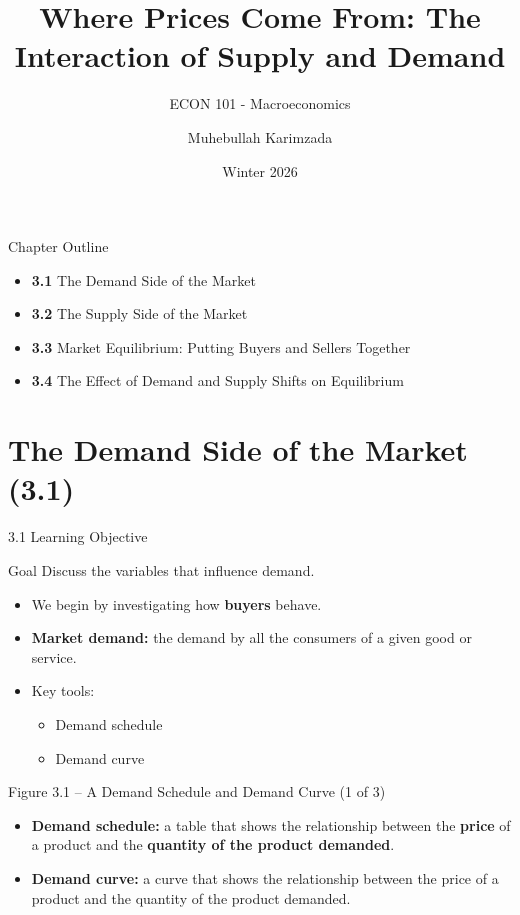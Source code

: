 \documentclass[aspectratio=169]{beamer}
\title{\textbf{Where Prices Come From: The Interaction of Supply and Demand \vspace{.5cm}\\  }}
\subtitle{ {\large ECON 101 - Macroeconomics}}
\author{Muhebullah Karimzada}
\date{Winter 2026}
\begin{document}
\begin{frame}[plain]
  \titlepage
\end{frame}

\begin{frame}{Chapter Outline}
\transfade
\begin{itemize}[<+->]
  \item \textbf{3.1} The Demand Side of the Market
  \item \textbf{3.2} The Supply Side of the Market
  \item \textbf{3.3} Market Equilibrium: Putting Buyers and Sellers Together
  \item \textbf{3.4} The Effect of Demand and Supply Shifts on Equilibrium
\end{itemize}
\end{frame}

\section{The Demand Side of the Market (3.1)}

\begin{frame}{3.1 Learning Objective}
\transfade
\begin{block}{Goal}
Discuss the variables that influence demand.
\end{block}
\begin{itemize}[<+->]
  \item We begin by investigating how \textbf{buyers} behave.
  \item \textbf{Market demand:} the demand by all the consumers of a given good or service.
  \item Key tools:
  \begin{itemize}[<+->]
    \item Demand schedule
    \item Demand curve
  \end{itemize}
\end{itemize}
\end{frame}

\begin{frame}{Figure 3.1 -- A Demand Schedule and Demand Curve (1 of 3)}
\transfade
\begin{itemize}[<+->]
  \item \textbf{Demand schedule:} a table that shows the relationship between the \textbf{price} of a product and the \textbf{quantity of the product demanded}.
  \item \textbf{Demand curve:} a curve that shows the relationship between the price of a product and the quantity of the product demanded.
\end{itemize}
\end{frame}
\end{document}
